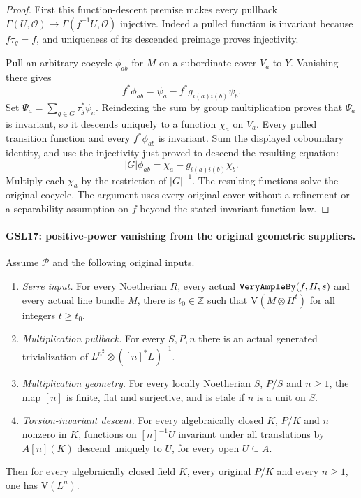 \documentclass[11pt,a4paper]{article}
\numberwithin{equation}{section}
\theoremstyle{remark}\newtheorem{remark}[theorem]{Remark}
\begin{document}
\begin{proof}
First this function-descent premise makes every pullback
$\Gamma(U,\mathcal O)\to\Gamma(f^{-1}U,\mathcal O)$ injective.
Indeed a pulled function is invariant because $f\tau_g=f$,
and uniqueness of its descended preimage proves injectivity.

Pull an arbitrary cocycle $\phi_{ab}$ for $M$ on a subordinate
cover $V_a$ to $Y$.  Vanishing there gives
\[
 f^*\phi_{ab}=\psi_a-f^*g_{i(a)i(b)}\psi_b.
\]
Set $\Psi_a=\sum_{g\in G}\tau_g^*\psi_a$.  Reindexing the sum
by group multiplication proves that $\Psi_a$ is invariant,
so it descends uniquely to a function $\chi_a$ on $V_a$.
Every pulled transition function and every $f^*\phi_{ab}$ is
invariant.  Sum the displayed coboundary identity, and use the
injectivity just proved to descend the resulting equation:
\[
 |G|\phi_{ab}=\chi_a-g_{i(a)i(b)}\chi_b.
\]
Multiply each $\chi_a$ by the restriction of $|G|^{-1}$.
The resulting functions solve the original cocycle.  The argument
uses every original cover without a refinement or a separability
assumption on $f$ beyond the stated invariant-function law.
\end{proof}

\paragraph{GSL17: positive-power vanishing from the original geometric suppliers.}
\label{claim:GSL17}
Assume $\mathcal P$ and the following original inputs.

\begin{enumerate}
 \item \emph{Serre input.}  For every Noetherian $R$, every actual
 $\texttt{Very\allowbreak Ample\allowbreak By}(f,H,s)$ and every actual line bundle $M$,
 there is $t_0\in\mathbb Z$ such that
 $\mathrm V(M\otimes H^t)$ for all integers $t\ge t_0$.
 \item \emph{Multiplication pullback.}  For every $S,P,n$ there
 is an actual generated trivialization of
 $L^{n^2}\otimes([n]^*L)^{-1}$.
 \item \emph{Multiplication geometry.}  For every locally Noetherian
 $S$, $P/S$ and $n\ge1$, the map $[n]$ is finite, flat and
 surjective, and is etale if $n$ is a unit on $S$.
 \item \emph{Torsion-invariant descent.}  For every algebraically
 closed $K$, $P/K$ and $n$ nonzero in $K$, functions on
 $[n]^{-1}U$ invariant under all translations by $A[n](K)$
 descend uniquely to $U$, for every open $U\subseteq A$.
\end{enumerate}
Then for every algebraically closed field $K$, every original
$P/K$ and every $n\ge1$, one has $\mathrm V(L^n)$.
\end{document}
